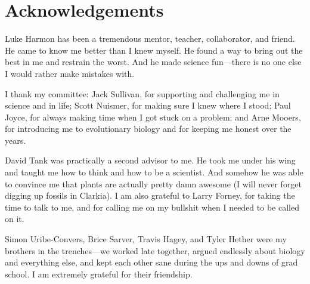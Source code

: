 \chapter*{Acknowledgements}

Luke Harmon has been a tremendous mentor, teacher, collaborator, and friend. He came to know me better than I knew myself. He found a way to bring out the best in me and restrain the worst. And he made science fun---there is no one else I would rather make mistakes with. 

I thank my committee: Jack Sullivan, for supporting and challenging me in science and in life; Scott Nuismer, for making sure I knew where I stood; Paul Joyce, for always making time when I got stuck on a problem; and Arne Mooers, for introducing me to evolutionary biology and for keeping me honest over the years.

David Tank was practically a second advisor to me. He took me under his wing and taught me how to think and how to be a scientist. And somehow he was able to convince me that plants are actually pretty damn awesome (I will never forget digging up fossils in Clarkia). I am also grateful to Larry Forney, for taking the time to talk to me, and for calling me on my bullshit when I needed to be called on it.

Simon Uribe-Convers, Brice Sarver, Travis Hagey, and Tyler Hether were my brothers in the trenches---we worked late together, argued endlessly about biology and everything else, and kept each other sane during the ups and downs of grad school. I am extremely grateful for their friendship.

